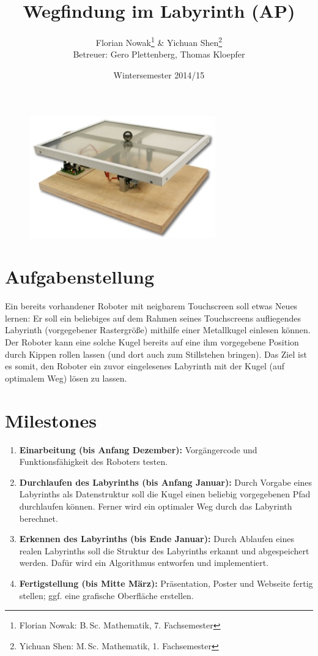 \documentclass[ngerman]{scrartcl}
\title{Wegfindung im Labyrinth (AP)}
\author{
    Florian Nowak\footnote{Florian Nowak: B.\,Sc. Mathematik, 7. Fachsemester}\; \& Yichuan Shen\footnote{Yichuan Shen: M.\,Sc. Mathematik, 1. Fachsemester}\\
    Betreuer: Gero Plettenberg, Thomas Kloepfer
}
\date{Wintersemester 2014/15}
\begin{document}

\maketitle

\begin{figure}[h]
    \centering
    \includegraphics[scale=.5]{platzhalter}
\end{figure}

\section*{Aufgabenstellung}

Ein bereits vorhandener Roboter mit neigbarem Touchscreen soll etwas Neues lernen: Er soll ein beliebiges auf dem Rahmen seines Touchscreens aufliegendes Labyrinth (vorgegebener Rastergröße) mithilfe einer Metallkugel einlesen können. Der Roboter kann eine solche Kugel bereits auf eine ihm vorgegebene Position durch Kippen rollen lassen (und dort auch zum Stillstehen bringen). Das Ziel ist es somit, den Roboter ein zuvor eingelesenes Labyrinth mit der Kugel (auf optimalem Weg) lösen zu lassen.

\section*{Milestones}
\begin{enumerate}
    \item \textbf{Einarbeitung (bis Anfang Dezember):} Vorgängercode und Funktionsfähigkeit des Roboters testen.
    \item \textbf{Durchlaufen des Labyrinths (bis Anfang Januar):} Durch Vorgabe eines Labyrinths als Datenstruktur soll die Kugel einen beliebig vorgegebenen Pfad durchlaufen können. Ferner wird ein optimaler Weg durch das Labyrinth berechnet.
    \item \textbf{Erkennen des Labyrinths (bis Ende Januar):} Durch Ablaufen eines realen Labyrinths soll die Struktur des Labyrinths erkannt und abgespeichert werden. Dafür wird ein Algorithmus entworfen und implementiert.
    \item \textbf{Fertigstellung (bis Mitte März):} Präsentation, Poster und Webseite fertig stellen; ggf. eine grafische Oberfläche erstellen.
\end{enumerate}
\end{document}
